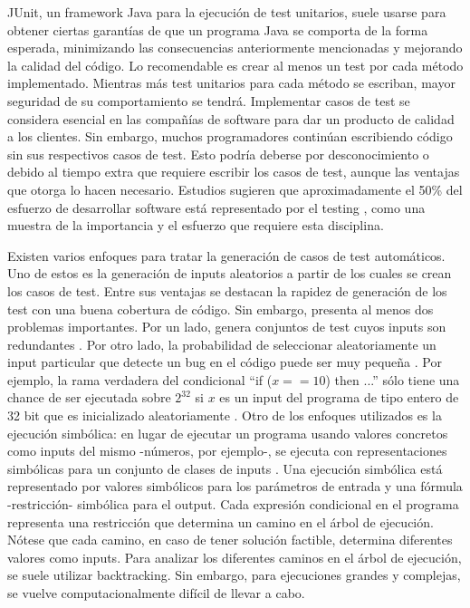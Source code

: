 \documentclass{llncs}
\begin{document}
JUnit, un framework Java para la ejecución de test unitarios, suele usarse para obtener ciertas garantías de que un programa Java se comporta de la forma esperada,
minimizando las consecuencias anteriormente mencionadas y mejorando la calidad del código. Lo recomendable es crear al menos un test por cada método implementado.
Mientras más test unitarios para cada método se escriban, mayor seguridad de su comportamiento se tendrá.
Implementar casos de test se considera esencial en las compañías de software para dar un producto de calidad a los clientes. Sin embargo, muchos programadores continúan escribiendo
código sin sus respectivos casos de test. Esto podría deberse por desconocimiento o debido al tiempo extra que requiere escribir los casos de test, aunque las ventajas que otorga
lo hacen necesario. Estudios sugieren que aproximadamente el 50\% del esfuerzo de desarrollar software está representado por el testing \cite{econImpact}, como una muestra de la
importancia y el esfuerzo que requiere esta disciplina.

Existen varios enfoques para tratar la generación de casos de test automáticos. Uno de estos es la generación de inputs aleatorios a partir de los cuales se crean los casos de test.
Entre sus ventajas se destacan la rapidez de generación de los test con una buena cobertura de código. Sin embargo, presenta al menos dos problemas importantes.
Por un lado, genera conjuntos de test cuyos inputs son redundantes \cite{cute}. Por otro lado, la probabilidad de seleccionar aleatoriamente un input particular que detecte un bug
en el código puede ser muy pequeña \cite{cute}. Por ejemplo, la rama verdadera del condicional “if ($x==10$) then ...” sólo tiene una chance de ser ejecutada sobre \(2^{32}\) si $x$
es un input del programa de tipo entero de 32 bit que es inicializado aleatoriamente \cite{dart}.
Otro de los enfoques utilizados es la ejecución simbólica: en lugar de ejecutar un programa usando valores concretos como inputs del mismo -números, por ejemplo-, se ejecuta con
representaciones simbólicas para un conjunto de clases de inputs \cite{symb}. Una ejecución simbólica está representado por valores simbólicos para los parámetros de entrada y una
fórmula -restricción- simbólica para el output. Cada expresión condicional en el programa representa una restricción que determina un camino en el árbol de ejecución.
Nótese que cada camino, en caso de tener solución factible, determina diferentes valores como inputs. Para analizar los diferentes caminos en el árbol de ejecución, se suele utilizar
backtracking. Sin embargo, para ejecuciones grandes y complejas, se vuelve computacionalmente difícil de llevar a cabo.
\end{document}
